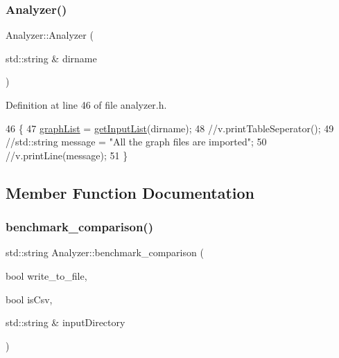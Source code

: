 \subsubsection{\texorpdfstring{Analyzer()}{Analyzer()}\hspace{0.1cm}{\footnotesize\ttfamily [2/2]}}
{\footnotesize\ttfamily Analyzer\+::\+Analyzer (\begin{DoxyParamCaption}\item[{std\+::string \&}]{dirname }\end{DoxyParamCaption})\hspace{0.3cm}{\ttfamily [inline]}}



Definition at line 46 of file analyzer.\+h.


\begin{DoxyCode}
46                                     \{
47             \hyperlink{class_analyzer_a567b5d8b2bbdde28b489834c1644446e}{graphList} = \hyperlink{class_analyzer_a7903ffdba689848dd199139e5dacf1bc}{getInputList}(dirname);
48             \textcolor{comment}{//v.printTableSeperator();}
49             \textcolor{comment}{//std::string message = "All the graph files are imported";}
50             \textcolor{comment}{//v.printLine(message);}
51         \}
\end{DoxyCode}


\subsection{Member Function Documentation}
\mbox{\label{class_analyzer_ae4637e33a985efefebf2a10502be351c}} 
\subsubsection{\texorpdfstring{benchmark\+\_\+comparison()}{benchmark\_comparison()}}
{\footnotesize\ttfamily std\+::string Analyzer\+::benchmark\+\_\+comparison (\begin{DoxyParamCaption}\item[{bool}]{write\+\_\+to\+\_\+file,  }\item[{bool}]{is\+Csv,  }\item[{std\+::string \&}]{input\+Directory }\end{DoxyParamCaption})}



